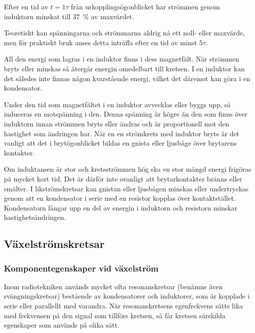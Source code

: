 \vspace*{1ex}

\noindent
Efter en tid av \(t = 1\tau\) från urkopplingsögonblicket har strömmen genom
induktorn minskat till 37~\% av maxvärdet.

Teoretiskt kan spänningarna och strömmarna aldrig nå ett noll- eller maxvärde,
men för praktiskt bruk anses detta inträffa efter en tid av minst \(5\tau\).

All den energi som lagras i en induktor finns i dess magnetfält.
När strömmen bryts eller minskas så återgår energin omedelbart till kretsen.
I en induktor kan det således inte finnas någon kvarstående energi, vilket
det däremot kan göra i en kondensator.

Under den tid som magnetfältet i en induktor avvecklas eller byggs upp, så
induceras en motspänning i den.
Denna spänning är högre än den som finns över induktorn innan strömmen bryts
eller ändras och är proportionell mot den hastighet som ändringen har.
När en en strömkrets med induktor bryts är det vanligt att det i brytögonblicket
bildas en gnista eller ljusbåge över brytarens kontakter.

Om induktansen är stor och kretsströmmen hög ska en stor mängd energi frigöras
på mycket kort tid.
Det är därför inte ovanligt att brytarkontakter bränns eller smälter.
I likströmskretsar kan gnistan eller ljusbågen minskas eller undertryckas genom
att en kondensator i serie med en resistor kopplas över kontaktstället.
Kondensatorn fångar upp en del av energin i induktorn och resistorn minskar
hastighetsändringen.

\subsection{Växelströmskretsar}

\subsubsection{Komponentegenskaper vid växelström}

Inom radiotekniken används mycket ofta resonanskretsar (benämns även
svängningskretsar) bestående av kondensatorer och induktorer, som är kopplade i
serie eller parallellt med varandra.
När resonanskretsens egenfrekvens sätts lika med frekvensen på den signal som
tillförs kretsen, så får kretsen särskilda egenskaper som används på olika sätt.

